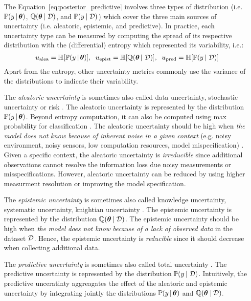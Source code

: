 The Equation~\ref{eq:posterior_predictive} involves three types of distribution (i.e. $\mathbb{P}(y \,|\, \bm{\theta})$, $\operatorname{\mathbb{Q}}(\bm{\theta} \,|\, \operatorname{\mathcal{D}})$, and $\mathbb{P}(y \,|\, \operatorname{\mathcal{D}})$) which cover the three main sources of uncertainty (i.e. aleatoric, epistemic, and predictive).
In practice, each uncertainty type can be measured by computing the spread of its respective distribution with the (differential) entropy which represented its variability, i.e.:
\begin{align}
     u_\text{alea} = \operatorname{\mathbb{H}}[\mathbb{P}(y \,|\, \bm{\theta})], \hspace{2mm}
     u_\text{epist} = \operatorname{\mathbb{H}}[\operatorname{\mathbb{Q}}(\bm{\theta} \,|\, \operatorname{\mathcal{D}})], \hspace{2mm}
     u_\text{pred} = \operatorname{\mathbb{H}}[\mathbb{P}(y \,|\, \operatorname{\mathcal{D}})]
\end{align}
Apart from the entropy, other uncertainty metrics commonly use the variance of the distributions to indicate their variability.

The \emph{aleatoric uncertainty} is sometimes also called data uncertainty, stochastic uncertainty or risk . 
The aleatoric uncertainty is represented by the distribution $\mathbb{P}(y \,|\, \bm{\theta})$.
Beyond entropy computation, it can also be computed using max probability for classification \cite{malini2018}.
The aleatoric uncertainty should be high when \emph{the model does not know because of inherent noise in a given context} (e.g. noisy environment, noisy sensors, low computation resources, model mispecification) .
Given a specific context, the aleatoric uncertainty is \emph{irreducible} since additional observations cannot resolve the information loss due noisy measurements or misspecifications. 
However, aleatoric uncertainty can be reduced by using higher measurment resolution or improving the model specification. 

The \emph{epistemic uncertainty} is sometimes also called knowledge uncertainty, systematic uncertainty, knightian uncertainty  .
The epistemic uncertainty is represented by the distribution $\operatorname{\mathbb{Q}}(\bm{\theta} \,|\, \operatorname{\mathcal{D}})$.
The epistemic uncertainty should be high when \emph{the model does not know because of a lack of observed data} in the dataset $\operatorname{\mathcal{D}}$.
Hence, the epistemic uncertainty is \emph{reducible} since it should decrease when collecting additional data.

The \emph{predictive uncertainty} is sometimes also called total uncertainty .
The predictive uncertainty is represented by the distribution $\mathbb{P}(y \,|\, \operatorname{\mathcal{D}})$.
Intuitively, the predictive unceratinty aggreagates the effect of the aleatoric and epistemic uncertainty by integrating jointly the distributions $\mathbb{P}(y \,|\, \bm{\theta})$ and $\operatorname{\mathbb{Q}}(\bm{\theta} \,|\, \operatorname{\mathcal{D}})$.

